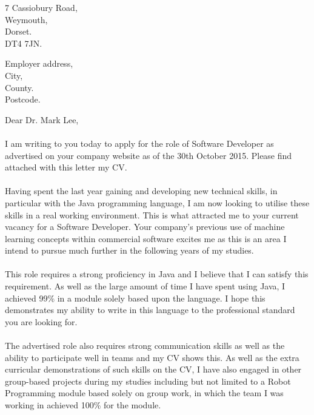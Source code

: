 \documentclass[12pt]{article}
\begin{document}

	\begin{flushright}
		7 Cassiobury Road,\\
		Weymouth,\\
		Dorset.\\
		DT4 7JN.
	\end{flushright}

	\begin{flushleft}
		Employer address,\\
		City,\\
		County.\\
		Postcode.
	\end{flushleft}

	\begin{flushleft}
		Dear Dr. Mark Lee, 
		\paragraph{}
			I am writing to you today to apply for the role of Software Developer as advertised on your company website as of the 30th October 2015. Please find attached with this letter my CV.
	
		\paragraph{}
			Having spent the last year gaining and developing new technical skills, in particular with the Java programming language, I am now looking to utilise these skills in a real working environment. This is what attracted me to your current vacancy for a Software Developer. Your company's previous use of machine learning concepts within commercial software excites me as this is an area I intend to pursue much further in the following years of my studies.

		\paragraph{}
			This role requires a strong proficiency in Java and I believe that I can satisfy this requirement. As well as the large amount of time I have spent using Java, I achieved 99\% in a module solely based upon the language. I hope this demonstrates my ability to write in this language to the professional standard you are looking for.

		\paragraph{}
			The advertised role also requires strong communication skills as well as the ability to participate well in teams and my CV shows this. As well as the extra curricular demonstrations of such skills on the CV, I have also engaged in other group-based projects during my studies including but not limited to a Robot Programming module based solely on group work, in which the team I was working in achieved 100\% for the module.


\end{flushleft}
\end{document}
